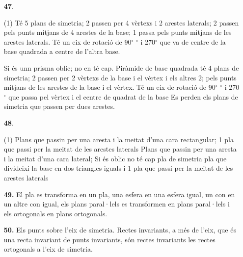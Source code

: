 \documentclass[a4paper, pdf, twoside]{book}
\begin{document}
\begin{multicols}{2}
\begin{enumerate}

 \item[\fontfamily{phv}\selectfont\color{blue}\textbf{47}. ] 
 \begin{tasks}[column-sep=1em, item-indent=1.3333em](1)
	 \task* Té 5 plans de simetria; 2 passen per 4 vèrtexs i 2 arestes laterals; 2 passen pels punts mitjans de 4 arestes de la base; 1 passa pels punts mitjans de les arestes laterals. Té un eix de rotació de 90$^\circ $
	 $^\circ $ i 270$^\circ $ que va de centre de la base quadrada a centre de l'altra base. \par Si és unn prisma oblic; no en té cap.
	 \task* Piràmide de base quadrada té 4 plans de simetria; 2 passen per 2 vèrtexs de la base i el vèrtex i els altres 2; pels punts mitjans de les arestes de la base i el vèrtex. Té un eix de rotació de 90$^\circ $
	 $^\circ $ i 270$^\circ $ que passa pel vèrtex i el centre de quadrat de la base
	 \task* Es perden els plans de simetria que passen per dues arestes. 
\end{tasks}
\vspace{0.25cm}



 \item[\fontfamily{phv}\selectfont\color{blue}\textbf{48}. ] 
 \begin{tasks}[column-sep=1em, item-indent=1.3333em](1)
	  Plans que passin per una aresta i la meitat d'una cara rectangular; 1 pla que passi per la meitat de les arestes laterals
	  Plans que passin per una aresta i la meitat d'una cara lateral; Si és oblic no té cap pla de simetria
	  pla que divideixi la base en dos triangles iguals i 1 pla que passi per la meitat de les arestes laterals
\end{tasks}
\vspace{0.25cm}
\item[\fontfamily{phv}\selectfont\color{blue}\textbf{49. }] 
El pla es transforma en un pla, una esfera en una esfera igual, un con en un altre con igual, els plans paral·lels es transformen en plans paral·lels i els ortogonals en plans ortogonals.
\vspace{0.25cm}
\item[\fontfamily{phv}\selectfont\color{blue}\textbf{50. }] 
Els punts sobre l'eix de simetria. Rectes invariants, a més de l'eix, que és una recta invariant de punts invariants, són rectes invariants les rectes ortogonals a l'eix de simetria.
 \end{enumerate}
\vspace{0.3cm}


\end{multicols}
\end{document}
